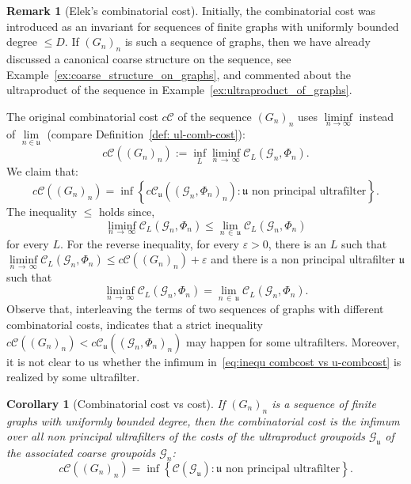 \documentclass[10pt]{amsart}
\newtheorem{coro}[cdrthm]{Corollary}
\theoremstyle{definition}
\newtheorem{rema}[cdrthm]{Remark}
\newcommand{\cost}{\mathcal{C}}
\newcommand{\ccost}{c\mathcal{C}}
\newcommand{\cg}{\mathcal{G}}
\newcommand{\ul}{\mathfrak{u}}
\begin{document}
\begin{rema}[Elek's combinatorial cost]\label{Rem: Elek comb cost}
Initially, the combinatorial cost \cite{Elek-combinatorial-cost-2007} was introduced as an invariant for sequences of finite graphs with uniformly bounded degree $\leq D$. If $(G_n)_n$ is such a sequence of graphs, then we have already discussed a canonical coarse structure on the sequence, see Example~\ref{ex:coarse_structure_on_graphs}, and commented about the ultraproduct of the sequence in Example~\ref{ex:ultraproduct_of_graphs}.

The original combinatorial cost $\ccost$ of the sequence $(G_n)_n$ uses $\liminf\limits_{n\to \infty}$ instead of $\lim\limits_{n\in \ul}$ (compare Definition~\ref{def: ul-comb-cost}):
\begin{equation}\label{def: init Elek comb cost with liminf}
\ccost((G_n)_n):=\inf_L\liminf\limits_{n\,\to\,\infty}\cost_L(\cg_n,\Phi_n).
\end{equation}
We claim that:
\begin{equation}\label{eq:inequ combcost vs u-combcost}
\ccost((G_n)_n) = \inf \left\{\ccost_{\ul}((\cg_n,\Phi_n)_n) : \ul \text{ non principal ultrafilter}\right\}.
\end{equation}
The inequality $\leq $ holds since,
\[
\liminf\limits_{n\,\to\,\infty}\cost_L(\cg_n,\Phi_n)\leq \lim\limits_{n\,\in\,\ul}\cost_L(\cg_n,\Phi_n)
\]
for every $L$. For the reverse inequality, for every $\varepsilon>0$, there is an $L$ such that $\liminf\limits_{n\,\to \,\infty}\cost_L(\cg_n,\Phi_n)\leq \ccost((G_n)_n) +\varepsilon$ and there is a non principal ultrafilter $\ul$ such that
\[
\liminf\limits_{n\,\to\,\infty}\cost_L(\cg_n,\Phi_n)=\lim\limits_{n\,\in\,\ul}\cost_L(\cg_n,\Phi_n).
\]
Observe that, interleaving the terms of two sequences of graphs with different combinatorial costs, indicates that a strict inequality $\ccost((G_n)_n) <\ccost_{\ul}((\cg_n,\Phi_n)_n)$ may happen for some ultrafilters. Moreover, it is not clear to us whether the infimum in~\eqref{eq:inequ combcost vs u-combcost} is realized by some ultrafilter.
\end{rema}


\begin{coro}[Combinatorial cost vs cost]\label{cor: combcost vs cost}
If $(G_n)_n$ is a sequence of finite graphs with uniformly bounded degree, then the combinatorial cost is the infimum over all non principal ultrafilters of the costs of the ultraproduct groupoids $\cg_\ul$ of the associated coarse groupoids $\cg_n$:
\[
\ccost((G_n)_n) = \inf \left\{\cost(\cg_{\ul}) : \ul \text{ non principal ultrafilter}\right\}.
\]
\end{coro}
\end{document}
